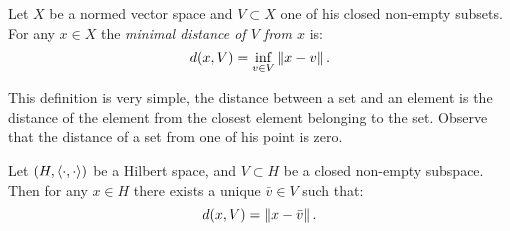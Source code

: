 \begin{defn}
	Let $X$ be a normed vector space and $V \subset X$ one of his closed non-empty subsets.\\
	For any $x \in X$ the \emph{minimal distance of $V$ from $x$} is:
	$$
	d(x,V) 
	= \inf\limits_{v \in V} \left\lVert x-v\right\rVert
	.
	$$
\end{defn}

This definition is very simple, the distance between a set and an element is the distance of the element from the closest element belonging to the set. Observe that the distance of a set from one of his point is zero.


\begin{theo} \label{theo-min-dist}
	Let $(H, \left\langle\cdot, \cdot\right\rangle)$ be a Hilbert space, and $V \subset H$ be a closed non-empty subspace.\\
	Then for any $x \in H$ there exists a unique $\bar v \in V$ such that:
	$$
	d(x,V) 
	= \left\lVert x-\bar v\right\rVert
	.
	$$
\end{theo}

